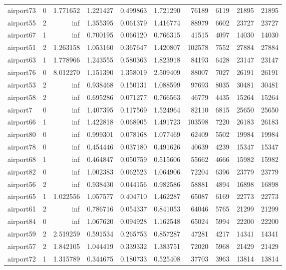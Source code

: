 \begin{longtable}{|l|r|r|r|r|r|r|r|r|r|}
airport73 & 0 & 1.771652 & 1.221427 & 0.499863 & 1.721290 & 76189 & 6119 & 21895 & 21895 \\
airport55 & 2 & inf & 1.355395 & 0.061379 & 1.416774 & 88979 & 6602 & 23727 & 23727 \\
airport67 & 1 & inf & 0.700195 & 0.066120 & 0.766315 & 41515 & 4097 & 14030 & 14030 \\
airport51 & 2 & 1.263158 & 1.053160 & 0.367647 & 1.420807 & 102578 & 7552 & 27884 & 27884 \\
airport63 & 1 & 1.778966 & 1.243555 & 0.580363 & 1.823918 & 84193 & 6428 & 23147 & 23147 \\
airport76 & 0 & 8.012270 & 1.151390 & 1.358019 & 2.509409 & 88007 & 7027 & 26191 & 26191 \\
airport53 & 2 & inf & 0.938468 & 0.150131 & 1.088599 & 97693 & 8035 & 30481 & 30481 \\
airport58 & 2 & inf & 0.695286 & 0.071277 & 0.766563 & 46779 & 4435 & 15264 & 15264 \\
airport7 & 0 & inf & 1.407395 & 0.117569 & 1.524964 & 82110 & 6815 & 25650 & 25650 \\
airport66 & 1 & inf & 1.422818 & 0.068905 & 1.491723 & 103598 & 7220 & 26183 & 26183 \\
airport80 & 0 & inf & 0.999301 & 0.078168 & 1.077469 & 62409 & 5502 & 19984 & 19984 \\
airport78 & 0 & inf & 0.454446 & 0.037180 & 0.491626 & 40639 & 4239 & 15347 & 15347 \\
airport68 & 1 & inf & 0.464847 & 0.050759 & 0.515606 & 55662 & 4666 & 15982 & 15982 \\
airport82 & 0 & inf & 1.002383 & 0.062523 & 1.064906 & 72204 & 6396 & 23779 & 23779 \\
airport56 & 2 & inf & 0.938430 & 0.044156 & 0.982586 & 58881 & 4894 & 16898 & 16898 \\
airport65 & 1 & 1.022556 & 1.057577 & 0.404710 & 1.462287 & 65087 & 6169 & 22773 & 22773 \\
airport61 & 2 & inf & 0.786716 & 0.054337 & 0.841053 & 64046 & 5765 & 21299 & 21299 \\
airport84 & 0 & inf & 1.067620 & 0.094928 & 1.162548 & 65024 & 5994 & 22200 & 22200 \\
airport59 & 2 & 2.519259 & 0.591534 & 0.265753 & 0.857287 & 47281 & 4217 & 14341 & 14341 \\
airport57 & 2 & 1.842105 & 1.044419 & 0.339332 & 1.383751 & 72020 & 5968 & 21429 & 21429 \\
airport72 & 1 & 1.315789 & 0.344675 & 0.180733 & 0.525408 & 37703 & 3963 & 13814 & 13814 \\

\end{longtable}
